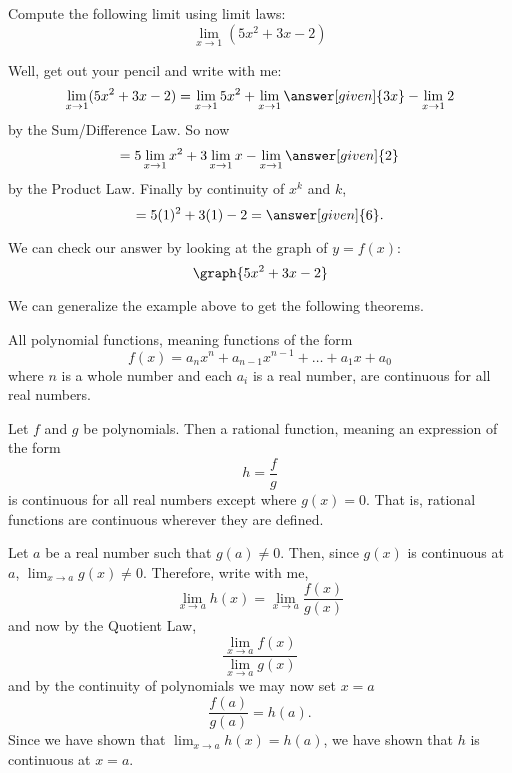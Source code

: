 \documentclass{ximera}
\begin{document}
\begin{example}
  Compute the following limit using limit laws:
  \[
  \displaystyle\lim_{x\to 1}(5x^2+3x-2)
  \]
\begin{explanation}
  Well, get out your pencil and write with me:
  \[
  \displaystyle\lim_{x\to 1} (5x^2+3x-2) = \lim_{x\to 1} 5x^2 + \lim_{x\to 1} \answer[given]{3x} - \lim_{x\to 1}2
  \]
  by the Sum/Difference Law. So now
  \[
  = 5\displaystyle\lim_{x\to 1} x^2 + 3\lim_{x\to 1} x - \lim_{x\to 1}\answer[given]{2}
  \]
  by the Product Law. Finally by continuity of $x^k$ and $k$,
  \[
  = 5(1)^2 + 3(1) - 2 =\answer[given]{6}.
  \]
  \begin{prompt}
    We can check our answer by looking at the graph of $y=f(x)$:
    \[
    \graph{5x^2+3x-2}
    \]
  \end{prompt}
\end{explanation}  
\end{example}

We can generalize the example above to get the following theorems.

\begin{theorem}
  All polynomial functions, meaning functions of the form
  \[
  f(x) = a_nx^n + a_{n-1}x^{n-1} + \dots + a_1 x + a_0
  \]
  where $n$ is a whole number and each $a_i$ is a real number, are
  continuous for all real numbers.
\end{theorem}

\begin{theorem}
  Let $f$ and $g$ be polynomials.  Then a rational function, meaning an
  expression of the form
  \[
  h=\frac{f}{g}
  \]
  is continuous for all real numbers except where $g(x)=0$.  That is,
  rational functions are continuous wherever they are defined.
\begin{explanation}
      Let $a$ be a real number such that $g(a)\neq 0$.  Then, since
      $g(x)$ is continuous at $a$, $\displaystyle\lim_{x\to a} g(x) \neq 0$.
      Therefore, write with me, 
      \[
      \displaystyle\lim_{x \to a} h(x) = \displaystyle\lim_{x\to a} \frac{f(x)}{g(x)}
      \]
      and now by the Quotient Law, 
      \[
      \frac{\displaystyle\lim_{x\to a} f(x)}{\displaystyle \lim_{x\to a} g(x)}
      \]
      and by the continuity of polynomials we may now set $x=a$
      \[
      \frac{f(a)}{g(a)}=h(a).
      \]
      Since we have shown that $\displaystyle\lim_{x\to a} h(x) = h(a)$, we have
      shown that $h$ is continuous at $x=a$.
\end{explanation}
\end{theorem}
\end{document}
